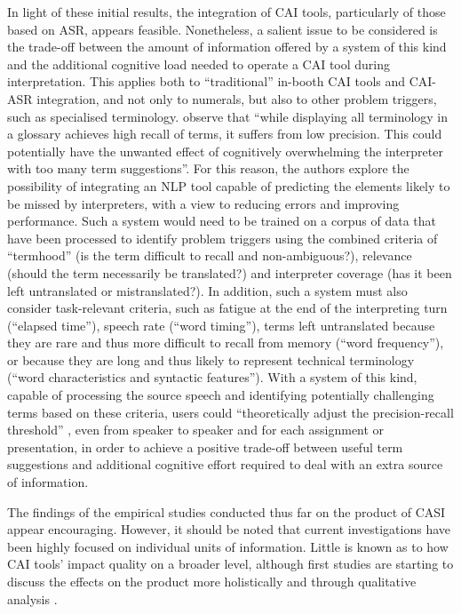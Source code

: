 In light of these initial results, the integration of CAI tools, particularly of those based on ASR, appears feasible. Nonetheless, a salient issue to be considered is the trade-off between the amount of information offered by a system of this kind and the additional cognitive load needed to operate a CAI tool during interpretation. This applies both to ``traditional'' in-booth CAI tools and CAI-ASR integration, and not only to numerals, but also to other problem triggers, such as specialised terminology. \citet[109]{stewart_automatic_2018} observe that ``while displaying all terminology in a glossary achieves high recall of terms, it suffers from low precision. This could potentially have the unwanted effect of cognitively overwhelming the interpreter with too many term suggestions''. For this reason, the authors explore the possibility of integrating an NLP tool capable of predicting the elements likely to be missed by interpreters, with a view to reducing errors and improving performance. Such a system would need to be trained on a corpus of data that have been processed to identify problem triggers using the combined criteria of ``termhood'' (is the term difficult to recall and non-ambiguous?), relevance (should the term necessarily be translated?) and interpreter coverage (has it been left untranslated or mistranslated?). In addition, such a system must also consider task-relevant criteria, such as fatigue at the end of the interpreting turn (``elapsed time''), speech rate (``word timing''), terms left untranslated because they are rare and thus more difficult to recall from memory (``word frequency''), or because they are long and thus likely to represent technical terminology (``word characteristics and syntactic features''). With a system of this kind, capable of processing the source speech and identifying potentially challenging terms based on these criteria, users could ``theoretically adjust the precision-recall threshold'' \citep[115]{stewart_automatic_2018}, even from speaker to speaker and for each assignment or presentation, in order to achieve a positive trade-off between useful term suggestions and additional cognitive effort required to deal with an extra source of information.

The findings of the empirical studies conducted thus far on the product of CASI appear encouraging. However, it should be noted that current investigations have been highly focused on individual units of information. Little is known as to how CAI tools' impact quality on a broader level, although first studies are starting to discuss the effects on the product more holistically and through qualitative analysis \citep{frittella_cai-supported_2021}.

